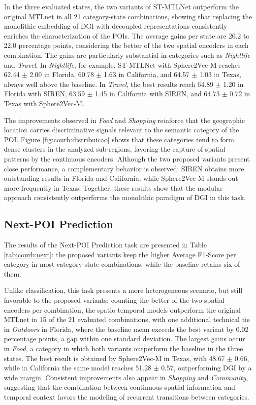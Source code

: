 In the three evaluated states, the two variants of ST-MTLNet outperform the original MTLnet in all 21 category-state combinations, showing that replacing the monolithic embedding of DGI with decoupled representations consistently enriches the characterization of the POIs. The average gains per state are 20.2 to 22.0 percentage points, considering the better of the two spatial encoders in each combination. The gains are particularly substantial in categories such as \textit{Nightlife} and \textit{Travel}. In \textit{Nightlife}, for example, ST-MTLNet with Sphere2Vec-M reaches 62.44 $\pm$ 2.00 in Florida, 60.78 $\pm$ 1.63 in California, and 64.57 $\pm$ 1.03 in Texas, always well above the baseline. In \textit{Travel}, the best results reach 64.89 $\pm$ 1.20 in Florida with SIREN, 63.59 $\pm$ 1.45 in California with SIREN, and 64.73 $\pm$ 0.72 in Texas with Sphere2Vec-M.



The improvements observed in \textit{Food} and \textit{Shopping} reinforce that the geographic location carries discriminative signals relevant to the semantic category of the POI. Figure \ref{fig:courb:distribuicao} shows that these categories tend to form dense clusters in the analyzed sub-regions, favoring the capture of spatial patterns by the continuous encoders. Although the two proposed variants present close performance, a complementary behavior is observed: SIREN obtains more outstanding results in Florida and California, while Sphere2Vec-M stands out more frequently in Texas. Together, these results show that the modular approach consistently outperforms the monolithic paradigm of DGI in this task.

\subsection{Next-POI Prediction}

The results of the Next-POI Prediction task are presented in Table \ref{tab:courb:next}: the proposed variants keep the higher Average F1-Score per category in most category-state combinations, while the baseline retains six of them.

Unlike classification, this task presents a more heterogeneous scenario, but still favorable to the proposed variants: counting the better of the two spatial encoders per combination, the spatio-temporal models outperform the original MTLnet in 15 of the 21 evaluated combinations, with one additional technical tie in \textit{Outdoors} in Florida, where the baseline mean exceeds the best variant by 0.02 percentage points, a gap within one standard deviation. The largest gains occur in \textit{Food}, a category in which both variants outperform the baseline in the three states. The best result is obtained by Sphere2Vec-M in Texas, with 48.67 $\pm$ 0.66, while in California the same model reaches 51.28 $\pm$ 0.57, outperforming DGI by a wide margin. Consistent improvements also appear in \textit{Shopping} and \textit{Community}, suggesting that the combination between continuous spatial information and temporal context favors the modeling of recurrent transitions between categories.

